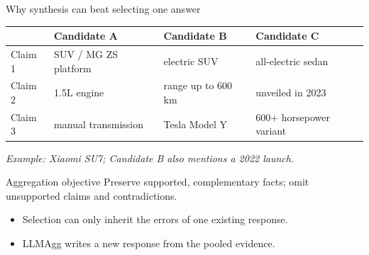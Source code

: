 \documentclass[aspectratio=169,10pt]{beamer}
\newcommand{\pos}[1]{\textcolor{positive}{#1}}
\newcommand{\con}[1]{\textcolor{negative}{#1}}
\newcommand{\muted}[1]{\textcolor{neutral}{#1}}
\newcommand{\LLMAgg}{\textsf{LLMAgg}}
\begin{document}
\begin{frame}{Why synthesis can beat selecting one answer}
  \begin{center}
  \color{ink}
  \begin{tabularx}{0.94\textwidth}{@{}l X X X@{}}
    \toprule
    & \textbf{Candidate A} & \textbf{Candidate B} & \textbf{Candidate C}\\
    \midrule
    Claim 1 & \con{SUV / MG ZS platform} & \con{electric SUV} & \pos{all-electric sedan}\\
    Claim 2 & \con{1.5L engine} & \muted{range up to 600 km} & \pos{unveiled in 2023}\\
    Claim 3 & \muted{manual transmission} & \muted{Tesla Model Y} & \pos{600+ horsepower variant}\\
    \bottomrule
  \end{tabularx}
  \end{center}
  \centering
  {\footnotesize \textit{Example: Xiaomi SU7; Candidate B also mentions a 2022 launch.}}
  \vspace{7pt}
  \begin{alertblock}{Aggregation objective}
    Preserve supported, complementary facts; omit unsupported claims and contradictions.
  \end{alertblock}
  \begin{itemize}
    \item Selection can only inherit the errors of one existing response.
    \item \LLMAgg{} writes a new response from the pooled evidence.
  \end{itemize}
\end{frame}
\end{document}
